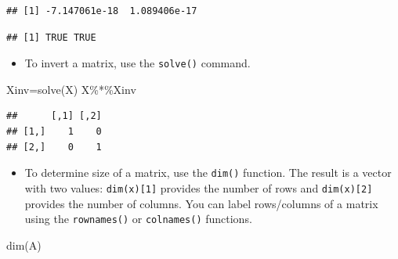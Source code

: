 \documentclass[
]{article}
\newenvironment{Shaded}{\begin{snugshade}}{\end{snugshade}}
\newcommand{\CommentTok}[1]{\textcolor[rgb]{0.56,0.35,0.01}{\textit{#1}}}
\newcommand{\FunctionTok}[1]{\textcolor[rgb]{0.00,0.00,0.00}{#1}}
\newcommand{\NormalTok}[1]{#1}
\newcommand{\OtherTok}[1]{\textcolor[rgb]{0.56,0.35,0.01}{#1}}
\newcommand{\SpecialCharTok}[1]{\textcolor[rgb]{0.00,0.00,0.00}{#1}}
\providecommand{\tightlist}{%
  \setlength{\itemsep}{0pt}\setlength{\parskip}{0pt}}
\theoremstyle{definition}
\theoremstyle{definition}
\theoremstyle{definition}
\theoremstyle{definition}
\theoremstyle{remark}
\begin{document}
\begin{verbatim}
## [1] -7.147061e-18  1.089406e-17
\end{verbatim}

\begin{Shaded}
\end{Shaded}

\begin{verbatim}
## [1] TRUE TRUE
\end{verbatim}

\begin{itemize}
\tightlist
\item
  To invert a matrix, use the \texttt{solve()} command.
\end{itemize}

\begin{Shaded}
\begin{Highlighting}[]
\NormalTok{Xinv}\OtherTok{=}\FunctionTok{solve}\NormalTok{(X)}
\NormalTok{X}\SpecialCharTok{\%*\%}\NormalTok{Xinv}
\end{Highlighting}
\end{Shaded}

\begin{verbatim}
##      [,1] [,2]
## [1,]    1    0
## [2,]    0    1
\end{verbatim}

\begin{itemize}
\tightlist
\item
  To determine size of a matrix, use the \texttt{dim()} function. The result is a vector with two values: \texttt{dim(x){[}1{]}} provides the number of rows and \texttt{dim(x){[}2{]}} provides the number of columns. You can label rows/columns of a matrix using the \texttt{rownames()} or \texttt{colnames()} functions.
\end{itemize}

\begin{Shaded}
\begin{Highlighting}[]
\FunctionTok{dim}\NormalTok{(A)}
\end{Highlighting}
\end{Shaded}
\end{document}
